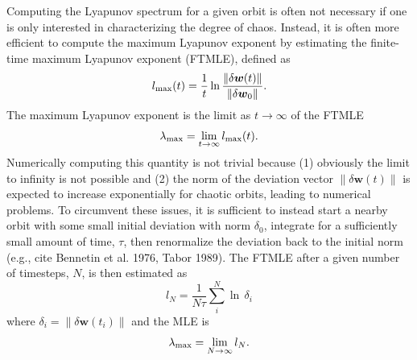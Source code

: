 \documentclass[letterpaper,12pt,preprint]{aastex}
\newcommand{\bs}[1]{\boldsymbol{#1}}
\begin{document}
Computing the Lyapunov spectrum for a given orbit is often not necessary if one is only interested in characterizing the degree of chaos. Instead, it is often more efficient to compute the maximum Lyapunov exponent by estimating the finite-time maximum Lyapunov exponent (FTMLE), defined as 
\begin{equation}
	l_{\rm max}(t) = \frac{1}{t}\ln \frac{\|\delta \bs{w}(t)\|}{\|\delta \bs{w}_0\|}.\label{eq:lmax}
\end{equation}
The maximum Lyapunov exponent is the limit as $t\rightarrow \infty$ of the FTMLE
\begin{equation}
	\lambda_{\rm max} = \lim_{t\rightarrow\infty}l_{\rm max}(t). \label{eq:lyapmax}
\end{equation}
Numerically computing this quantity is not trivial because (1) obviously the limit to infinity is not possible and (2) the norm of the deviation vector $\|\delta \bs{w}(t)\|$ is expected to increase exponentially for chaotic orbits, leading to numerical problems. To circumvent these issues, it is sufficient to instead start a nearby orbit with some small initial deviation with norm $\delta_0$, integrate for a sufficiently small amount of time, $\tau$, then renormalize the deviation back to the initial norm (e.g., cite Bennetin et al. 1976, Tabor 1989). 
The FTMLE after a given number of timesteps, $N$, is then estimated as
\begin{equation}
	l_N = \frac{1}{N\tau}\sum_i^N \ln \, \delta_i \label{eq:ftmle}
\end{equation}
where $\delta_i=\|\delta \bs{w}(t_i)\|$ and the MLE is
\begin{equation}
	\lambda_{\rm max} = \lim_{N\rightarrow \infty} l_N.
\end{equation}
\end{document}
